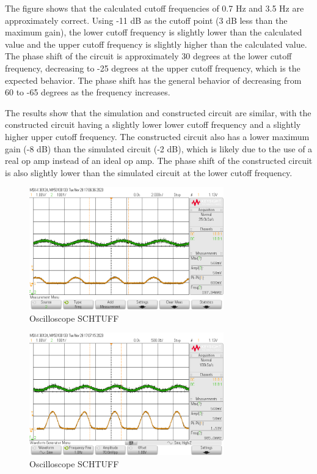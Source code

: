 \documentclass[CMPE]{KGCOEReport}
\begin{document}
The figure shows that the calculated cutoff frequencies of 0.7 Hz and 3.5 Hz are approximately correct. Using -11 dB as the cutoff point (3 dB less than the maximum gain), the lower cutoff frequency is slightly lower than the calculated value and the upper cutoff frequency is slightly higher than the calculated value. The phase shift of the circuit is approximately 30 degrees at the lower cutoff frequency, decreasing to -25 degrees at the upper cutoff frequency, which is the expected behavior. The phase shift has the general behavior of decreasing from 60 to -65 degrees as the frequency increases.

The results show that the simulation and constructed circuit are similar, with the constructed circuit having a slightly lower lower cutoff frequency and a slightly higher upper cutoff frequency. The constructed circuit also has a lower maximum gain (-8 dB) than the simulated circuit (-2 dB), which is likely due to the use of a real op amp instead of an ideal op amp. The phase shift of the constructed circuit is also slightly lower than the simulated circuit at the lower cutoff frequency.

\begin{figure}[H]
    \centering
    \includegraphics[width=0.75\textwidth]{200mHz.png}
    \caption{Oscilloscope SCHTUFF}
    \label{fig:200mHzCapture}
\end{figure}

\begin{figure}[H]
    \centering
    \includegraphics[width=0.75\textwidth]{1Hz.png}
    \caption{Oscilloscope SCHTUFF}
    \label{fig:1HzCapture}
\end{figure}
\end{document}
